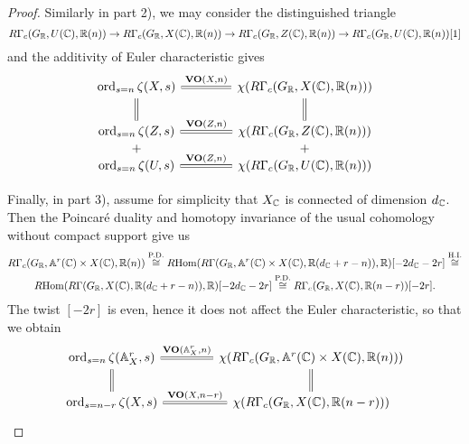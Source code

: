 \documentclass{article}
\numberwithin{equation}{section}
\begin{document}
\begin{proposition}
\begin{proof}
    Similarly in part 2), we may consider the distinguished triangle
    \[ R\Gamma_c (G_{\mathbb{R}}, U (\mathbb{C}), \mathbb{R} (n)) \to
      R\Gamma_c (G_{\mathbb{R}}, X (\mathbb{C}), \mathbb{R} (n)) \to
      R\Gamma_c (G_{\mathbb{R}}, Z (\mathbb{C}), \mathbb{R} (n)) \to
      R\Gamma_c (G_{\mathbb{R}}, U (\mathbb{C}), \mathbb{R} (n)) [1] \]
    and the additivity of Euler characteristic gives
    \[ \begin{tikzcd}[column sep=4em]
        \ord_{s=n} \zeta (X,s) \ar[equals]{r}{\mathbf{VO} (X,n)}\ar[equals]{d} & \chi (R\Gamma_c (G_\RR, X(\CC), \RR (n))) \ar[equals]{d} \\
        \ord_{s=n} \zeta (Z,s) \ar[equals]{r}{\mathbf{VO} (Z,n)} & \chi (R\Gamma_c (G_\RR, Z (\CC), \RR (n))) \\[-2em]
        + & + \\[-2em]
        \ord_{s=n} \zeta (U,s) \ar[equals]{r}{\mathbf{VO} (Z,n)} & \chi (R\Gamma_c (G_\RR, U (\CC), \RR (n)))
      \end{tikzcd} \]

    Finally, in part 3), assume for simplicity that $X_{\mathbb{C}}$ is connected of
    dimension $d_{\mathbb{C}}$. Then the Poincaré duality and homotopy invariance of the
    usual cohomology without compact support give us
    \begin{multline*}
      R\Gamma_c (G_{\mathbb{R}}, \mathbb{A}^r (\mathbb{C}) \times X (\mathbb{C}), \mathbb{R} (n)) \stackrel{\text{P.D.}}{\cong}
      R\!\operatorname{Hom} (R\Gamma (G_{\mathbb{R}}, \mathbb{A}^r (\mathbb{C}) \times X (\mathbb{C}), \mathbb{R} (d_{\mathbb{C}} + r - n)), \mathbb{R}) [-2d_{\mathbb{C}} - 2r] \stackrel{\text{H.I.}}{\cong} \\
      R\!\operatorname{Hom} (R\Gamma (G_{\mathbb{R}}, X (\mathbb{C}), \mathbb{R} (d_{\mathbb{C}} + r - n)), \mathbb{R}) [-2d_{\mathbb{C}} - 2r] \stackrel{\text{P.D.}}{\cong}
      R\Gamma_c (G_{\mathbb{R}}, X (\mathbb{C}), \mathbb{R} (n - r)) [-2r].
    \end{multline*}
    The twist $[-2r]$ is even, hence it does not affect the Euler
    characteristic, so that we obtain
    \[ \begin{tikzcd}[column sep=4em]
        \ord_{s=n} \zeta (\AA^r_X,s) \ar[equals]{r}{\mathbf{VO} (\AA^r_X,n)}\ar[equals]{d} & \chi (R\Gamma_c (G_\RR, \AA^r (\CC) \times X(\CC), \RR (n))) \ar[equals]{d} \\
        \ord_{s=n-r} \zeta (X,s) \ar[equals]{r}{\mathbf{VO} (X,n-r)} & \chi (R\Gamma_c (G_\RR, X (\CC), \RR (n-r)))
      \end{tikzcd} \]
  \end{proof}
\end{proposition}
\end{document}
